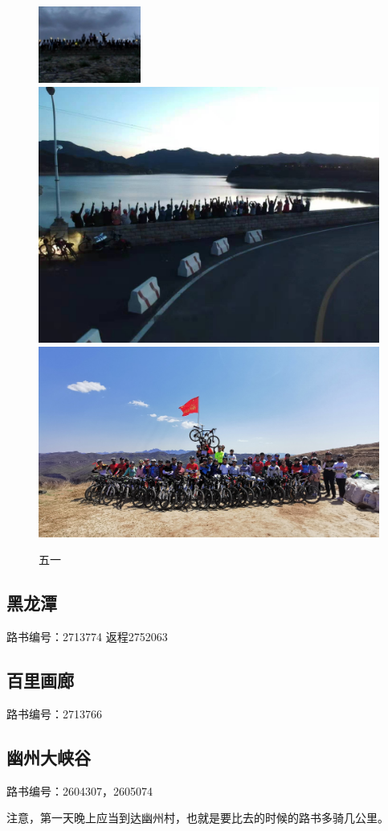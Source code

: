 \documentclass{ctexbook}
\begin{document}
\begin{figure}[ht]

    \centering
    \includegraphics[width=0.3\textwidth]{fig/五一第一天2018年.jpg}
    \hfill
    \includegraphics[width=0.3\linewidth]{fig/五一第一天2021年.jpg}
    \hfill
    \includegraphics[width=0.3\linewidth]{fig/五一第二天.jpg}
    \hfill
    \caption{五一}
\end{figure}
\subsection{黑龙潭}
路书编号：2713774 返程2752063
\subsection{百里画廊}
路书编号：2713766
\subsection{幽州大峡谷}
路书编号：2604307，2605074

注意，第一天晚上应当到达幽州村，也就是要比去的时候的路书多骑几公里。
\end{document}
